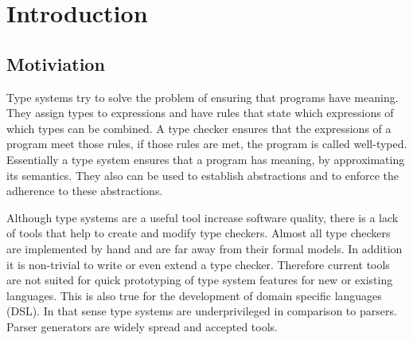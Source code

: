 \documentclass[a4paper,twoside]{report}
\begin{document}


\newpage
\thispagestyle{empty}
\mbox{}



\begin{abstract}

\end{abstract}

\tableofcontents


\chapter{Introduction}
\section{Motiviation}

Type systems try to solve the problem of ensuring that programs have
meaning. They assign types to expressions and have rules that state
which expressions of which types can be combined. A type checker
ensures that the expressions of a program meet those rules, if those
rules are met, the program is called well-typed. Essentially a type
system ensures that a program has meaning, by approximating its
semantics. They also can be used to establish abstractions and to
enforce the adherence to these abstractions.

Although type systems are a useful tool increase software quality,
there is a lack of tools that help to create and modify type
checkers. Almost all type checkers are implemented by hand and are far
away from their formal models. In addition it is non-trivial to write
or even extend a type checker. Therefore current tools are not suited
for quick prototyping of type system features for new or existing
languages. This is also true for the development of domain specific
languages (DSL). In that sense type systems are underprivileged in
comparison to parsers. Parser generators are widely spread and
accepted tools.
\end{document}
